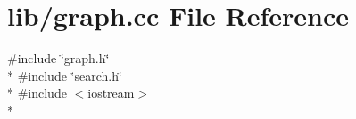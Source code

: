 \section{lib/graph.cc File Reference}
\label{graph_8cc}
{\ttfamily \#include \char`\"{}graph.\-h\char`\"{}}\\*
{\ttfamily \#include \char`\"{}search.\-h\char`\"{}}\\*
{\ttfamily \#include $<$iostream$>$}\\*
